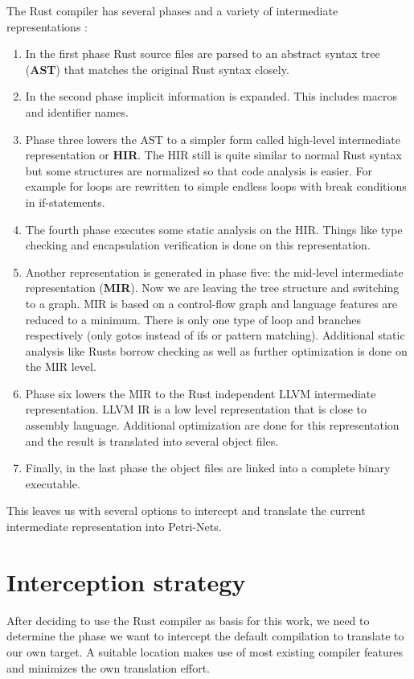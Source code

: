 The Rust compiler has several phases and a variety of intermediate representations \cite[Chapter 2.1]{rustc-guide}:
\begin{enumerate}
    \item In the first phase Rust source files are parsed to an abstract syntax tree (\textbf{AST}) that matches the original Rust syntax closely.
    \item In the second phase implicit information is expanded. This includes macros and identifier names.
    \item Phase three lowers the AST to a simpler form called high-level intermediate representation or \textbf{HIR}.
    The HIR still is quite similar to normal Rust syntax but some structures are normalized so that code analysis is easier. 
    For example for loops are rewritten to simple endless loops with break conditions in if-statements.
    \item The fourth phase executes some static analysis on the HIR.
    Things like type checking and encapsulation verification is done on this representation.
    \item Another representation is generated in phase five: the mid-level intermediate representation (\textbf{MIR}).
    Now we are leaving the tree structure and switching to a graph.
    MIR is based on a control-flow graph\cite{10.1145/800028.808479} and language features are reduced to a minimum.
    There is only one type of loop and branches respectively (only gotos instead of ifs or pattern matching).
    Additional static analysis like Rusts borrow checking as well as further optimization is done on the MIR level.
    \item Phase six lowers the MIR to the Rust independent LLVM\cite{lattner2004llvm} intermediate representation.
    LLVM IR is a low level representation that is close to assembly language.
    Additional optimization are done for this representation and the result is translated into several object files.
    \item Finally, in the last phase the object files are linked into a complete binary executable.
\end{enumerate}
This leaves us with several options to intercept and translate the current intermediate representation into Petri-Nets.

\section{Interception strategy}
\label{app_intercept}
After deciding to use the Rust compiler as basis for this work, we need to determine the phase we want to intercept the default compilation to translate to our own target.
A suitable location makes use of most existing compiler features and minimizes the own translation effort.

